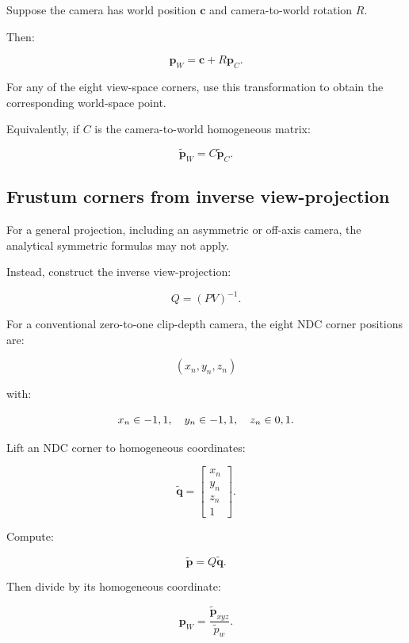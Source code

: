 Suppose the camera has world position \(\mathbf c\) and camera-to-world rotation \(R\).

Then:

\[
 \boxed{ \mathbf p_W=\mathbf c+R\mathbf p_C }.
\]

For any of the eight view-space corners, use this transformation to obtain the corresponding world-space point.

Equivalently, if \(C\) is the camera-to-world homogeneous matrix:

\[
 \boxed{ \tilde{\mathbf p}_W=C\tilde{\mathbf p}_C }.
\]

\subsection{Frustum corners from inverse view-projection}\label{02-foundations-ii-ch034-frustum-corners-from-inverse-view-projection}

For a general projection, including an asymmetric or off-axis camera, the analytical symmetric formulas may not apply.

Instead, construct the inverse view-projection:

\[
 \boxed{ Q=(PV)^{-1} }.
\]

For a conventional zero-to-one clip-depth camera, the eight NDC corner positions are:

\[
 (x_n,y_n,z_n)
\]

with:

\[
 x_n\in\\{-1,1\\},\quad y_n\in\\{-1,1\\},\quad z_n\in\\{0,1\\}.
\]

Lift an NDC corner to homogeneous coordinates:

\[
 \tilde{\mathbf q}= \begin{bmatrix}x_n\\y_n\\z_n\\1\end{bmatrix}.
\]

Compute:

\[
 \tilde{\mathbf p}=Q\tilde{\mathbf q}.
\]

Then divide by its homogeneous coordinate:

\[
 \boxed{ \mathbf p_W= \frac{\tilde{\mathbf p}_{xyz}}{\tilde p_w} }.
\]

